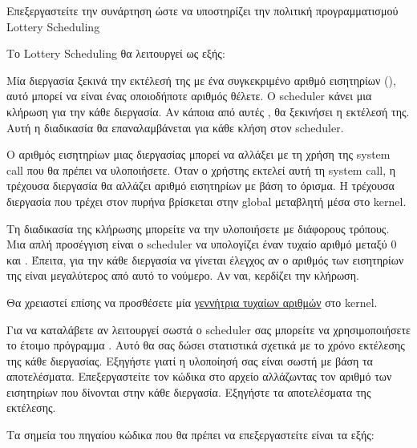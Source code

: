 \documentclass[18pt]{extarticle}
\begin{document}

\begin{question}
    Επεξεργαστείτε την συνάρτηση  ώστε να υποστηρίζει την πολιτική προγραμματισμού Lottery Scheduling \cite{OSTEP-SchedLottery, LotteryScheduling1994}

    Το Lottery Scheduling θα λειτουργεί ως εξής:

    Μία διεργασία ξεκινά την εκτέλεσή της με ένα συγκεκριμένο αριθμό εισητηρίων (), αυτό μπορεί να είναι ένας οποιοδήποτε αριθμός θέλετε.
    Ο scheduler κάνει μια κλήρωση για την κάθε διεργασία. Αν κάποια από αυτές , θα ξεκινήσει η εκτέλεσή της.
    Αυτή η διαδικασία θα επαναλαμβάνεται για κάθε κλήση στον scheduler.

    Ο αριθμός εισητηρίων μιας διεργασίας μπορεί να αλλάξει με τη χρήση της system call  που θα πρέπει να υλοποιήσετε.
    Όταν ο χρήστης εκτελεί αυτή τη system call, η τρέχουσα διεργασία θα αλλάζει αριθμό εισητηρίων με βάση το όρισμα. Η τρέχουσα διεργασία 
    που τρέχει στον πυρήνα βρίσκεται στην global μεταβλητή  μέσα στο kernel.

    Τη διαδικασία της κλήρωσης μπορείτε να την υλοποιήσετε με διάφορους τρόπους.
    Μια απλή προσέγγιση είναι ο scheduler να υπολογίζει έναν τυχαίο αριθμό μεταξύ 0 και .
    Έπειτα, για την κάθε διεργασία να γίνεται έλεγχος αν ο αριθμός των εισητηρίων της είναι μεγαλύτερος από αυτό το νούμερο. Αν ναι, κερδίζει την κλήρωση.

    Θα χρειαστεί επίσης να προσθέσετε μία \href{https://wiki.osdev.org/Random_Number_Generator#Pseudorandom_number_generators}{γεννήτρια τυχαίων αριθμών} στο kernel.

    Για να καταλάβετε αν λειτουργεί σωστά ο scheduler σας μπορείτε να χρησιμοποιήσετε 
    το έτοιμο πρόγραμμα . Αυτό θα σας δώσει στατιστικά σχετικά με το χρόνο εκτέλεσης 
    της κάθε διεργασίας. Εξηγήστε γιατί η υλοποίησή σας είναι σωστή με βάση τα αποτελέσματα.
    Επεξεργαστείτε τον κώδικα στο αρχείο  αλλάζωντας τον αριθμό των εισητηρίων 
    που δίνονται στην κάθε διεργασία. Εξηγήστε τα αποτελέσματα της εκτέλεσης.

    \begin{info}[Βοήθεια:]
        Τα σημεία του πηγαίου κώδικα που θα πρέπει να επεξεργαστείτε είναι τα εξής: 
        

\end{info}
\end{question}
\end{document}
